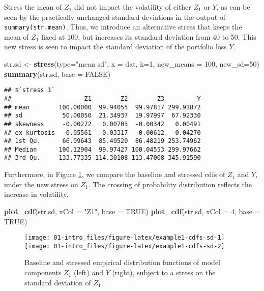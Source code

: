 \documentclass[]{article}
\newenvironment{Shaded}{\begin{snugshade}}{\end{snugshade}}
\newcommand{\DataTypeTok}[1]{\textcolor[rgb]{0.13,0.29,0.53}{#1}}
\newcommand{\DecValTok}[1]{\textcolor[rgb]{0.00,0.00,0.81}{#1}}
\newcommand{\KeywordTok}[1]{\textcolor[rgb]{0.13,0.29,0.53}{\textbf{#1}}}
\newcommand{\NormalTok}[1]{#1}
\newcommand{\OtherTok}[1]{\textcolor[rgb]{0.56,0.35,0.01}{#1}}
\newcommand{\StringTok}[1]{\textcolor[rgb]{0.31,0.60,0.02}{#1}}
\begin{document}
Stress the mean of \(Z_1\) did not impact the volatility of either \(Z_1\) or \(Y\), as can be seen by the practically unchanged standard deviations in the output of \texttt{summary(str.mean)}. Thus, we introduce an alternative stress that keeps the mean of \(Z_1\) fixed at 100, but increases its standard deviation from 40 to 50. This new stress is seen to impact the standard deviation of the portfolio loss \(Y\).

\begin{Shaded}
\begin{Highlighting}[]
\NormalTok{str.sd <-}\StringTok{ }\KeywordTok{stress}\NormalTok{(}\DataTypeTok{type=}\StringTok{"mean sd"}\NormalTok{, }\DataTypeTok{x =}\NormalTok{ dat, }\DataTypeTok{k=}\DecValTok{1}\NormalTok{, }\DataTypeTok{new_means =} \DecValTok{100}\NormalTok{, }\DataTypeTok{new_sd=}\DecValTok{50}\NormalTok{)}
\KeywordTok{summary}\NormalTok{(str.sd, }\DataTypeTok{base =} \OtherTok{FALSE}\NormalTok{)}
\end{Highlighting}
\end{Shaded}

\begin{verbatim}
## $`stress 1`
##                    Z1        Z2        Z3         Y
## mean        100.00000  99.94055  99.97817 299.91872
## sd           50.00050  21.34937  19.97997  67.92330
## skewness     -0.00272   0.00703  -0.00342   0.00491
## ex kurtosis  -0.05561  -0.03317  -0.00612  -0.04270
## 1st Qu.      66.09643  85.49520  86.48219 253.74962
## Median      100.12904  99.97427 100.04553 299.97662
## 3rd Qu.     133.77335 114.30108 113.47008 345.91590
\end{verbatim}

Furthermore, in Figure \ref{fig:example1-cdfs-sd}, we compare the baseline and stressed cdfs of \(Z_1\) and \(Y\), under the new stress on \(Z_1\). The crossing of probability distribution reflects the increase in volatility.

\begin{Shaded}
\begin{Highlighting}[]
\KeywordTok{plot_cdf}\NormalTok{(str.sd, }\DataTypeTok{xCol =} \StringTok{"Z1"}\NormalTok{, }\DataTypeTok{base =} \OtherTok{TRUE}\NormalTok{)}
\KeywordTok{plot_cdf}\NormalTok{(str.sd, }\DataTypeTok{xCol =} \DecValTok{4}\NormalTok{, }\DataTypeTok{base =} \OtherTok{TRUE}\NormalTok{)}
\end{Highlighting}
\end{Shaded}

\begin{figure}
\texttt{[image: 01-intro\_files/figure-latex/example1-cdfs-sd-1]} \texttt{[image: 01-intro\_files/figure-latex/example1-cdfs-sd-2]} \caption{Baseline and stressed empirical distribution functions of model components  $Z_1$ (left) and $Y$ (right), subject to a stress on the standard deviation of $Z_1$.}\label{fig:example1-cdfs-sd}
\end{figure}
\end{document}
